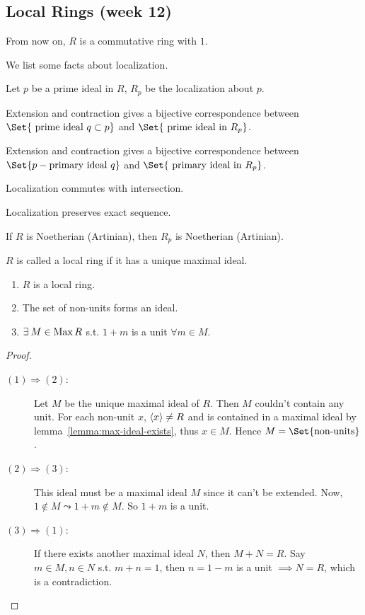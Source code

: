 \subsection{Local Rings (week 12)}

From now on, $R$ is a commutative ring with $1$.

We list some facts about localization.
\begin{prop} \label{prop:property-of-localization}
  Let $p$ be a prime ideal in $R$, $R_p$ be the localization about $p$.
\item Extension and contraction gives a bijective correspondence between
  $\Set{ \text{ prime ideal } q \subset p }$ and $\Set{ \text{ prime ideal in } R_p}$.
\item Extension and contraction gives a bijective correspondence between
  $\Set{ p-\text{primary ideal } q }$ and $\Set{ \text{ primary ideal in } R_p}$.
\item Localization commutes with intersection.
\item Localization preserves exact sequence.
\item If $R$ is Noetherian (Artinian), then $R_p$ is Noetherian (Artinian).
\end{prop}

\begin{definition}
  $R$ is called a local ring if it has a unique maximal ideal.
\end{definition}

\begin{prop} \mbox{}
  \begin{enumerate}[(1)]
    \item $R$ is a local ring.
    \item The set of non-units forms an ideal.
    \item $\exists M \in \Max R$ s.t. $1 + m$ is a unit $\forall m \in M$.
  \end{enumerate}

  \begin{proof} \mbox{}
    \begin{description}
      \item[$(1)\Rightarrow(2)$:]
        Let $M$ be the unique maximal ideal of $R$. Then $M$ couldn't contain
        any unit. For each non-unit $x$,
        $\langle x\rangle \neq R$ and is contained in a maximal ideal by
        lemma~\ref{lemma:max-ideal-exists}, thus $x \in M$.
        Hence $M = \Set{ \text{non-units} }$.
      \item[$(2) \Rightarrow (3)$:]
        This ideal must be a maximal ideal $M$ since it can't be extended.
        Now, $1 \notin M \leadsto 1 + m \notin M$. So $1 + m$ is a unit.
      \item[$(3)\Rightarrow(1)$:]
        If there exists another maximal ideal $N$, then $M + N = R$.
        Say $m \in  M, n \in N$ s.t. $m + n = 1$, then $n = 1 - m$ is a unit
        $\implies N = R$, which is a contradiction.
        \qedhere
    \end{description}
  \end{proof}
\end{prop}

